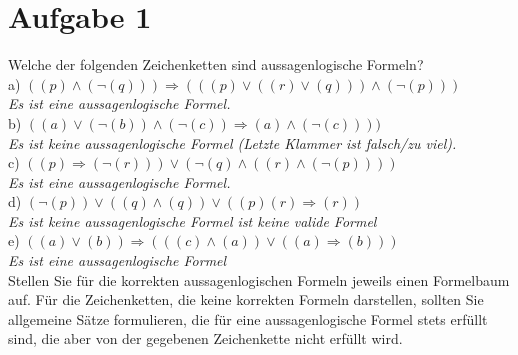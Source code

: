 \section*{Aufgabe 1}

Welche der folgenden Zeichenketten sind aussagenlogische Formeln?\\

a) $((p) \land (\lnot(q))) \Rightarrow (((p) \lor ((r) \lor (q))) \land (\lnot (p)))$\\

\textit{Es ist eine aussagenlogische Formel.}\\

b) $((a) \lor (\lnot (b)) \land (\lnot (c)) \Rightarrow (a) \land (\lnot(c))))$\\

\textit{Es ist keine aussagenlogische Formel (Letzte Klammer ist falsch/zu viel).}\\

c) $((p) \Rightarrow (\lnot (r))) \lor (\lnot (q) \land ((r) \land (\lnot (p))))$\\

\textit{Es ist eine aussagenlogische Formel.}\\

d) $(\lnot (p)) \lor ((q) \land (q)) \lor ((p)(r) \Rightarrow (r))$\\

\textit{Es ist keine aussagenlogische Formel ist keine valide Formel}\\

e) $((a) \lor (b)) \Rightarrow (((c) \land (a)) \lor ((a) \Rightarrow (b)))$\\

\textit{Es ist eine aussagenlogische Formel}\\

Stellen Sie für die korrekten aussagenlogischen Formeln jeweils einen Formelbaum auf. Für die
Zeichenketten, die keine korrekten Formeln darstellen, sollten Sie allgemeine Sätze formulieren, die für eine aussagenlogische Formel stets erfüllt sind, die aber von der gegebenen Zeichenkette nicht erfüllt wird.